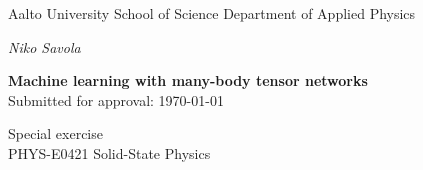 

\lfoot{}
\cfoot{}
\rfoot{\thepage}


\usepackage[braket, qm]{qcircuit}  %




\begin{titlepage}
    {\sffamily
    \noindent
    \fontsize{12}{14}\selectfont
    Aalto University \newline
    School of Science \newline
    Department of Applied Physics

    \vspace{40mm}

    \noindent
    \fontsize{14}{16}\selectfont
    \emph{Niko Savola}

    \vspace{10mm}

    \noindent
    \fontsize{18}{22}\selectfont
    \textbf{Machine learning with many-body tensor networks}\\

    \fontsize{12}{14}\selectfont
    \noindent
    Submitted for approval: \today

    \vspace{70mm}

    \noindent
    Special exercise \\[4mm]
    PHYS-E0421 \textendash{} Solid-State Physics \\[4mm]
    } %

\end{titlepage}
\newpage


